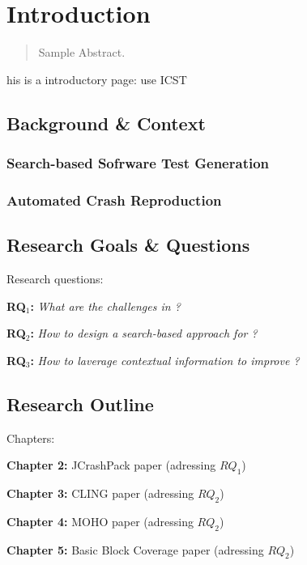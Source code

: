\chapter{Introduction}
\label{introduction}

\begin{abstract}
Sample Abstract. 
\end{abstract}



\newpage

his is a introductory page: use ICST

\section{Background \& Context}
\subsection{Search-based Sofrware Test Generation}

\subsection{Automated Crash Reproduction}

\section{Research Goals \& Questions}
Research questions:


\textbf{RQ$_1$: } \textit{What are the challenges in \sing?}

\textbf{RQ$_2$: } \textit{How to design a search-based approach for \sing?}

\textbf{RQ$_3$: } \textit{How to laverage contextual information to improve \sing?}


\section{Research Outline}

Chapters:

\textbf{Chapter 2: } JCrashPack paper (adressing $RQ_1$)

\textbf{Chapter 3: } CLING paper (adressing $RQ_2$)

\textbf{Chapter 4: } MOHO paper (adressing $RQ_2$)

\textbf{Chapter 5: } Basic Block Coverage paper (adressing $RQ_2$)

